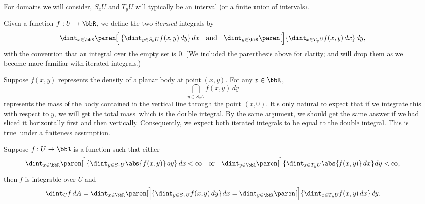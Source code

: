   For domains we will consider, $S_x U$ and $T_y U$ will typically be an 
interval (or a finite union of intervals).
  \begin{definition}
    Given a function $f:U \to \bbR$, we define the two \emph{iterated} integrals 
by
    \begin{equation*}
      \dint_{x \in \bbR} \paren[\Big]{ \dint_{y \in S_xU} f(x, y) \, dy } \, dx
      \quad\text{and}\quad
      \dint_{y \in \bbR} \paren[\Big]{ \dint_{x \in T_y U} f(x, y) \, dx } \, 
dy,
    \end{equation*}
    with the convention that an integral over the empty set is $0$.
    (We included the parenthesis above for clarity; and will drop them as we 
become more familiar with iterated integrals.)
  \end{definition}

  Suppose $f(x, y)$ represents the density of a planar body at point $(x, y)$.
  For any $x \in \bbR$,
  \begin{equation*}
    \dint_{y \in S_xU} f(x, y) \, dy
  \end{equation*}
  represents the mass of the body contained in the vertical line through the 
point $(x, 0)$.
  It's only natural to expect that if we integrate this with respect to $y$, we 
will get the total mass, which is the double integral.
  By the same argument, we should get the same answer if we had sliced it 
horizontally first and then vertically.
  Consequently, we expect both iterated integrals to be equal to the double 
integral.
  This is true, under a finiteness assumption.

  \begin{theorem}
    Suppose $f:U \to \bbR$ is a function such that either
    \begin{equation}\label{eqnFubiniFiniteness}
      \dint_{x \in \bbR} \paren[\Big]{ \dint_{y \in S_xU} \abs{f(x, y)} \, dy } 
\, dx < \infty
      \quad\text{or}\quad
      \dint_{y \in \bbR} \paren[\Big]{ \dint_{x \in T_y U} \abs{f(x, y)} \, dx } 
\, dy < \infty,
    \end{equation}
    then $f$ is integrable over $U$ and
    \begin{equation*}
      \dint_U f \, dA
	= \dint_{x \in \bbR} \paren[\Big]{ \dint_{y \in S_xU} f(x, y) \, dy } \, 
dx
	= \dint_{y \in \bbR} \paren[\Big]{ \dint_{x \in T_y U} f(x, y) \, dx } 
\, dy.
    \end{equation*}
  \end{theorem}

